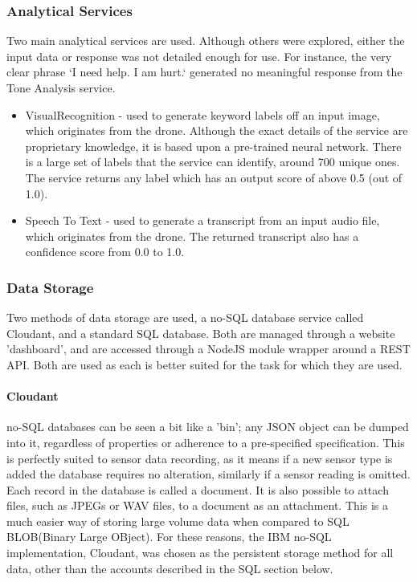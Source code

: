 \documentclass{article}
\begin{document}
\subsubsection{Analytical Services}\label{AnalyticalServices}
Two main analytical services are used. Although others were explored, either the input data or response was not detailed enough for use. For instance, the very clear phrase `I need help. I am hurt.` generated no meaningful response from the Tone Analysis service. 
\begin{itemize}
	\item VisualRecognition - used to generate keyword labels off an input image, which originates from the drone. Although the exact details of the service are proprietary knowledge, it is based upon a pre-trained neural network. There is a large set of labels that the service can identify, around 700 unique ones. The service returns any label which has an output score of above 0.5 (out of 1.0). 
	\item Speech To Text - used to generate a transcript from an input audio file, which originates from the drone. The returned transcript also has a confidence score from 0.0 to 1.0. 
\end{itemize}

\subsubsection{Data Storage}
Two methods of data storage are used, a no-SQL database service called Cloudant, and a standard SQL database. Both are managed through a website 'dashboard', and are accessed through a NodeJS module wrapper around a REST API. Both are used as each is better suited for the task for which they are used.
\paragraph{Cloudant}
no-SQL databases can be seen a bit like a 'bin'; any JSON object can be dumped into it, regardless of properties or adherence to a pre-specified specification. This is perfectly suited to sensor data recording, as it means if a new sensor type is added the database requires no alteration, similarly if a sensor reading is omitted. Each record in the database is called a document. It is also possible to attach files, such as JPEGs or WAV files, to a document as an attachment. This is a much easier way of storing large volume data when compared to SQL BLOB(Binary Large OBject). For these reasons, the IBM no-SQL implementation, Cloudant, was chosen as the persistent storage method for all data, other than the accounts described in the SQL section below. 
\end{document}
